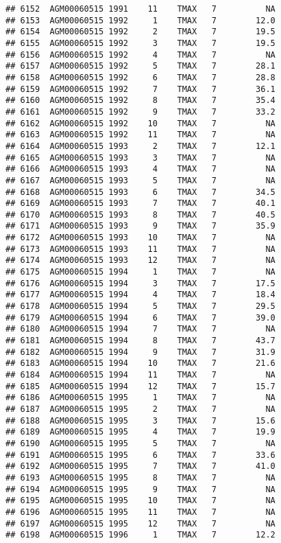 \documentclass{article}\usepackage[]{graphicx}\usepackage[]{color}
\makeatletter
\newenvironment{kframe}{%
 \def\at@end@of@kframe{}%
 \ifinner\ifhmode%
  \def\at@end@of@kframe{\end{minipage}}%
  \begin{minipage}{\columnwidth}%
 \fi\fi%
 \def\FrameCommand##1{\hskip\@totalleftmargin \hskip-\fboxsep
 \colorbox{shadecolor}{##1}\hskip-\fboxsep
     \hskip-\linewidth \hskip-\@totalleftmargin \hskip\columnwidth}%
 \MakeFramed {\advance\hsize-\width
   \@totalleftmargin\z@ \linewidth\hsize
   \@setminipage}}%
 {\par\unskip\endMakeFramed%
 \at@end@of@kframe}
\newenvironment{knitrout}{}{} %
\makeatother
\begin{document}
\begin{knitrout}
\begin{kframe}
\begin{verbatim}
## 6152  AGM00060515 1991    11    TMAX   7          NA
## 6153  AGM00060515 1992     1    TMAX   7        12.0
## 6154  AGM00060515 1992     2    TMAX   7        19.5
## 6155  AGM00060515 1992     3    TMAX   7        19.5
## 6156  AGM00060515 1992     4    TMAX   7          NA
## 6157  AGM00060515 1992     5    TMAX   7        28.1
## 6158  AGM00060515 1992     6    TMAX   7        28.8
## 6159  AGM00060515 1992     7    TMAX   7        36.1
## 6160  AGM00060515 1992     8    TMAX   7        35.4
## 6161  AGM00060515 1992     9    TMAX   7        33.2
## 6162  AGM00060515 1992    10    TMAX   7          NA
## 6163  AGM00060515 1992    11    TMAX   7          NA
## 6164  AGM00060515 1993     2    TMAX   7        12.1
## 6165  AGM00060515 1993     3    TMAX   7          NA
## 6166  AGM00060515 1993     4    TMAX   7          NA
## 6167  AGM00060515 1993     5    TMAX   7          NA
## 6168  AGM00060515 1993     6    TMAX   7        34.5
## 6169  AGM00060515 1993     7    TMAX   7        40.1
## 6170  AGM00060515 1993     8    TMAX   7        40.5
## 6171  AGM00060515 1993     9    TMAX   7        35.9
## 6172  AGM00060515 1993    10    TMAX   7          NA
## 6173  AGM00060515 1993    11    TMAX   7          NA
## 6174  AGM00060515 1993    12    TMAX   7          NA
## 6175  AGM00060515 1994     1    TMAX   7          NA
## 6176  AGM00060515 1994     3    TMAX   7        17.5
## 6177  AGM00060515 1994     4    TMAX   7        18.4
## 6178  AGM00060515 1994     5    TMAX   7        29.5
## 6179  AGM00060515 1994     6    TMAX   7        39.0
## 6180  AGM00060515 1994     7    TMAX   7          NA
## 6181  AGM00060515 1994     8    TMAX   7        43.7
## 6182  AGM00060515 1994     9    TMAX   7        31.9
## 6183  AGM00060515 1994    10    TMAX   7        21.6
## 6184  AGM00060515 1994    11    TMAX   7          NA
## 6185  AGM00060515 1994    12    TMAX   7        15.7
## 6186  AGM00060515 1995     1    TMAX   7          NA
## 6187  AGM00060515 1995     2    TMAX   7          NA
## 6188  AGM00060515 1995     3    TMAX   7        15.6
## 6189  AGM00060515 1995     4    TMAX   7        19.9
## 6190  AGM00060515 1995     5    TMAX   7          NA
## 6191  AGM00060515 1995     6    TMAX   7        33.6
## 6192  AGM00060515 1995     7    TMAX   7        41.0
## 6193  AGM00060515 1995     8    TMAX   7          NA
## 6194  AGM00060515 1995     9    TMAX   7          NA
## 6195  AGM00060515 1995    10    TMAX   7          NA
## 6196  AGM00060515 1995    11    TMAX   7          NA
## 6197  AGM00060515 1995    12    TMAX   7          NA
## 6198  AGM00060515 1996     1    TMAX   7        12.2

\end{verbatim}
\end{kframe}
\end{knitrout}
\end{document}
